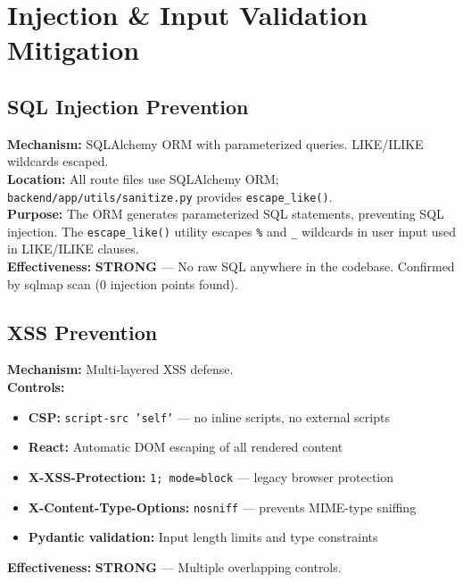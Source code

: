 \documentclass[11pt,a4paper]{article}
\begin{document}
\section{Injection \& Input Validation Mitigation}

\subsection{SQL Injection Prevention}

\begin{tcolorbox}[colback=shieldgreen!5, colframe=shieldgreen]
\textbf{Mechanism:} SQLAlchemy ORM with parameterized queries. LIKE/ILIKE wildcards escaped.\\
\textbf{Location:} All route files use SQLAlchemy ORM; \texttt{backend/app/utils/sanitize.py} provides \texttt{escape\_like()}.\\
\textbf{Purpose:} The ORM generates parameterized SQL statements, preventing SQL injection. The \texttt{escape\_like()} utility escapes \texttt{\%} and \texttt{\_} wildcards in user input used in LIKE/ILIKE clauses.\\
\textbf{Effectiveness:} \textcolor{shieldgreen}{\textbf{STRONG}} — No raw SQL anywhere in the codebase. Confirmed by sqlmap scan (0 injection points found).
\end{tcolorbox}

\subsection{XSS Prevention}

\begin{tcolorbox}[colback=shieldgreen!5, colframe=shieldgreen]
\textbf{Mechanism:} Multi-layered XSS defense.\\
\textbf{Controls:}
\begin{itemize}[nosep]
  \item \textbf{CSP:} \texttt{script-src 'self'} — no inline scripts, no external scripts
  \item \textbf{React:} Automatic DOM escaping of all rendered content
  \item \textbf{X-XSS-Protection:} \texttt{1; mode=block} — legacy browser protection
  \item \textbf{X-Content-Type-Options:} \texttt{nosniff} — prevents MIME-type sniffing
  \item \textbf{Pydantic validation:} Input length limits and type constraints
\end{itemize}
\textbf{Effectiveness:} \textcolor{shieldgreen}{\textbf{STRONG}} — Multiple overlapping controls.
\end{tcolorbox}
\end{document}
